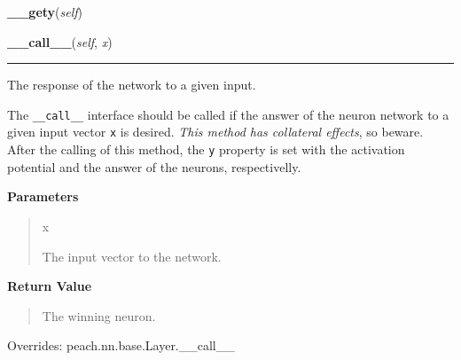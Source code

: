     \begin{boxedminipage}{\textwidth}

    \raggedright \textbf{\_\_gety}(\textit{self})

    \end{boxedminipage}

    \vspace{0.5ex}

    \begin{boxedminipage}{\textwidth}

    \raggedright \textbf{\_\_call\_\_}(\textit{self}, \textit{x})

    \vspace{-1.5ex}

    \rule{\textwidth}{0.5\fboxrule}

The response of the network to a given input.

The \texttt{{\_}{\_}call{\_}{\_}} interface should be called if the answer of the neuron
network to a given input vector \texttt{x} is desired. \emph{This method has
collateral effects}, so beware. After the calling of this method, the
\texttt{y} property is set with the activation potential and the answer of
the neurons, respectivelly.
    \vspace{1ex}

      \textbf{Parameters}
      \begin{quote}
        \begin{Ventry}{x}

          \item[x]


The input vector to the network.
        \end{Ventry}

      \end{quote}

    \vspace{1ex}

      \textbf{Return Value}
      \begin{quote}

The winning neuron.
      \end{quote}

    \vspace{1ex}

      Overrides: peach.nn.base.Layer.\_\_call\_\_

    \end{boxedminipage}

    \label{peach:nn:nn:SOM:learn}

